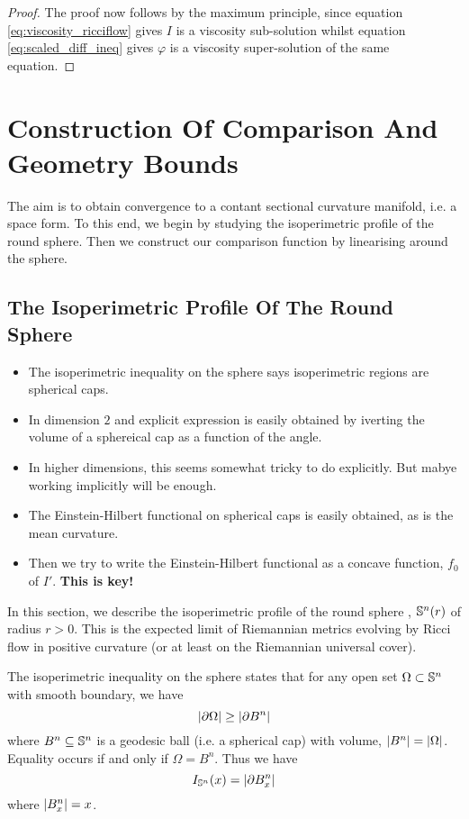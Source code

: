 \documentclass{amsart}
\begin{document}
\begin{proof}
The proof now follows by the maximum principle, since equation \eqref{eq:viscosity_ricciflow} gives \(I\) is a viscosity sub-solution whilst equation \eqref{eq:scaled_diff_ineq} gives \(\varphi\) is a viscosity super-solution of the same equation.
\end{proof}
\section{Construction Of Comparison And Geometry Bounds}

The aim is to obtain convergence to a contant sectional curvature manifold, i.e. a space form. To this end, we begin by studying the isoperimetric profile of the round sphere. Then we construct our comparison function by linearising around the sphere.

\subsection{The Isoperimetric Profile Of The Round Sphere}

\begin{itemize}
\item The isoperimetric inequality on the sphere says isoperimetric regions are spherical caps.
\item In dimension \(2\) and explicit expression is easily obtained by iverting the volume of a sphereical cap as a function of the angle.
\item In higher dimensions, this seems somewhat tricky to do explicitly. But mabye working implicitly will be enough.
\item The Einstein-Hilbert functional on spherical caps is easily obtained, as is the mean curvature.
\item Then we try to write the Einstein-Hilbert functional as a concave function, \(f_0\) of \(I'\). \textbf{This is key!}
\end{itemize}

In this section, we describe the isoperimetric profile of the round sphere , \(\S^n(r)\) of radius \(r > 0\). This is the expected limit of Riemannian metrics evolving by Ricci flow in positive curvature (or at least on the Riemannian universal cover).

The isoperimetric inequality on the sphere states that for any open set \(\Omega \subset \S^n\) with smooth boundary, we have
\[
\abs{\bdry{\Omega}} \geq \abs{\bdry{B^n}}
\]
where \(B^n \subseteq \S^n\) is a geodesic ball (i.e. a spherical cap) with volume, \(\abs{B^n} = \abs{\Omega}\). Equality occurs if and only if \(\Omega = B^n\). Thus we have
\[
I_{\S^n} (x) = \abs{\bdry{B^n_x}}
\]
where \(\abs{B^n_x} = x\).
\end{document}
